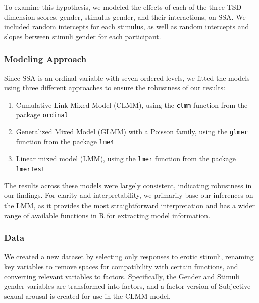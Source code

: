 \documentclass[
  bookmarksnumbered]{article}
\providecommand{\tightlist}{%
  \setlength{\itemsep}{0pt}\setlength{\parskip}{0pt}}
\begin{document}
To examine this hypothesis, we modeled the effects of each of the three TSD dimension scores, gender, stimulus gender, and their interactions, on SSA. We included random intercepts for each stimulus, as well as random intercepts and slopes between stimuli gender for each participant.

\subsubsection{Modeling Approach}\label{modeling-approach}

Since SSA is an ordinal variable with seven ordered levels, we fitted the models using three different approaches to ensure the robustness of our results:

\begin{enumerate}
\def\labelenumi{\arabic{enumi}.}
\tightlist
\item
  Cumulative Link Mixed Model (CLMM), using the \texttt{clmm} function from the package \texttt{ordinal} \autocite{ordinalcit}
\item
  Generalized Mixed Model (GLMM) with a Poisson family, using the \texttt{glmer} function from the package \texttt{lme4} \autocite{lme4cit}
\item
  Linear mixed model (LMM), using the \texttt{lmer} function from the package \texttt{lmerTest} \autocite{lmertestcit}
\end{enumerate}

The results across these models were largely consistent, indicating robustness in our findings. For clarity and interpretability, we primarily base our inferences on the LMM, as it provides the most straightforward interpretation and has a wider range of available functions in R for extracting model information.

\subsubsection{Data}\label{data-1}

We created a new dataset by selecting only responses to erotic stimuli, renaming key variables to remove spaces for compatibility with certain functions, and converting relevant variables to factors. Specifically, the Gender and Stimuli gender variables are transformed into factors, and a factor version of Subjective sexual arousal is created for use in the CLMM model.
\end{document}
